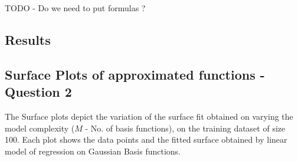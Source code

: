 \documentclass{article}
\begin{document}
TODO - Do we need to put formulas ?


\subsection{Results}


\subsection{Surface Plots of approximated functions - Question 2}
\begin{flushleft}
The Surface plots depict the variation of the surface fit obtained on varying the model complexity ($M$ - No. of basis functions), on the training dataset of size 100. Each plot shows the data points and the fitted surface obtained by linear model of regression on Gaussian Basis functions.

\end{flushleft}
\end{document}
